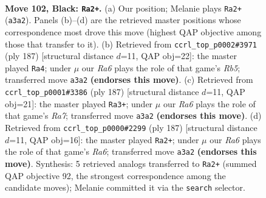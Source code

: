 \documentclass[11pt]{article}
\begin{document}
\clearpage

\begin{figure}[p]\centering
\begin{subfigure}{0.46\textwidth}\centering
\resizebox{\linewidth}{!}{%
\newchessgame
\chessboard[
  setfen={8/3k4/4p3/6R1/1R2P3/r4P2/5K2/8 b - - 8 102},
  showmover=false,
  pgfstyle=straightmove, color=movearrow, markmove={a3-a2}
]}
\caption{}
\end{subfigure}\hfill
\begin{subfigure}{0.46\textwidth}\centering
\resizebox{\linewidth}{!}{%
\newchessgame
\chessboard[
  setfen={4R3/6k1/6p1/6P1/1r5P/6K1/8/8 b - - 10 94},
  showmover=false,
  pgfstyle=straightmove, color=movearrow, markmove={b4-a4}
]}
\caption{}
\end{subfigure}
\\[4pt]
\begin{subfigure}{0.46\textwidth}\centering
\resizebox{\linewidth}{!}{%
\newchessgame
\chessboard[
  setfen={8/8/6kp/3R4/6P1/6K1/r4P2/8 b - - 2 94},
  showmover=false,
  pgfstyle=straightmove, color=movearrow, markmove={a2-a3}
]}
\caption{}
\end{subfigure}\hfill
\begin{subfigure}{0.46\textwidth}\centering
\resizebox{\linewidth}{!}{%
\newchessgame
\chessboard[
  setfen={8/8/7k/5R2/6p1/r5P1/3K1P2/8 b - - 93 94},
  showmover=false,
  pgfstyle=straightmove, color=movearrow, markmove={a3-a2}
]}
\caption{}
\end{subfigure}
\caption{\textbf{Move 102, Black: \texttt{Ra2+}.} (a) Our position; Melanie plays \texttt{Ra2+} (\texttt{a3a2}). Panels (b)--(d) are the retrieved master positions whose correspondence most drove this move (highest QAP objective among those that transfer to it). (b) Retrieved from \texttt{ccrl\_top\_p0002\#3971} (ply 187) [structural distance $d$=11, QAP obj=22]: the master played \texttt{Ra4}; under $\mu$ our \emph{Ra6} plays the role of that game's \emph{Rb5}; transferred move \texttt{a3a2} \textbf{(endorses this move)}. (c) Retrieved from \texttt{ccrl\_top\_p0001\#3386} (ply 187) [structural distance $d$=11, QAP obj=21]: the master played \texttt{Ra3+}; under $\mu$ our \emph{Ra6} plays the role of that game's \emph{Ra7}; transferred move \texttt{a3a2} \textbf{(endorses this move)}. (d) Retrieved from \texttt{ccrl\_top\_p0000\#2299} (ply 187) [structural distance $d$=11, QAP obj=16]: the master played \texttt{Ra2+}; under $\mu$ our \emph{Ra6} plays the role of that game's \emph{Ra6}; transferred move \texttt{a3a2} \textbf{(endorses this move)}. Synthesis: 5 retrieved analogs transferred to \texttt{Ra2+} (summed QAP objective 92, the strongest correspondence among the candidate moves); Melanie committed it via the \texttt{search} selector.}
\label{fig:thought-m203}
\end{figure}
\end{document}
